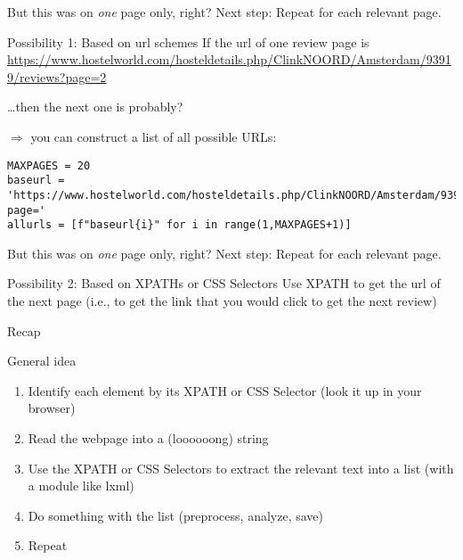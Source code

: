 \begin{frame}[fragile]{But this was on \emph{one} page only, right?}
Next step: Repeat for each relevant page.

\begin{block}{Possibility 1: Based on url schemes}
	If the url of one review page is \url{https://www.hostelworld.com/hosteldetails.php/ClinkNOORD/Amsterdam/93919/reviews?page=2}

\ldots then the next one is probably?
\end{block}

\pause

$\Rightarrow$ you can construct a list of all possible URLs:

\begin{lstlisting}
MAXPAGES = 20
baseurl = 'https://www.hostelworld.com/hosteldetails.php/ClinkNOORD/Amsterdam/93919/reviews?page='
allurls = [f"baseurl{i}" for i in range(1,MAXPAGES+1)]
\end{lstlisting}	
	
\end{frame}



\begin{frame}[fragile]{But this was on \emph{one} page only, right?}
  Next step: Repeat for each relevant page.
  
  \begin{block}{Possibility 2: Based on XPATHs or CSS Selectors}
    Use XPATH to get the url of the next page (i.e., to get the link that you would click to get the next review)
  \end{block}
	
\end{frame}


\begin{frame}{Recap}
\begin{block}{General idea}
\begin{enumerate}
\item Identify each element by its XPATH or CSS Selector (look it up in your browser) 
\item Read the webpage into a (loooooong) string
\item Use the XPATH  or CSS Selectors to extract the relevant text into a list (with a module like lxml)
\item Do something with the list (preprocess, analyze, save)
\item Repeat
\end{enumerate}
\end{block}
\end{frame}


